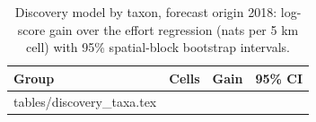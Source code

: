 \documentclass[11pt]{article}
\makeatletter
\newcommand{\tabinput}[1]{\@@input #1 }
\makeatother
\begin{document}
\begin{table}[h]
\centering\small
\caption{Discovery model by taxon, forecast origin 2018: log-score gain over the effort regression (nats per 5 km cell) with 95\% spatial-block bootstrap intervals.}
\label{tab:taxa}
\begin{tabular}{@{}lrcc@{}}
\toprule
Group & Cells & Gain & 95\% CI \\
\midrule
\tabinput{tables/discovery_taxa.tex}
\bottomrule
\end{tabular}
\end{table}
\end{document}
